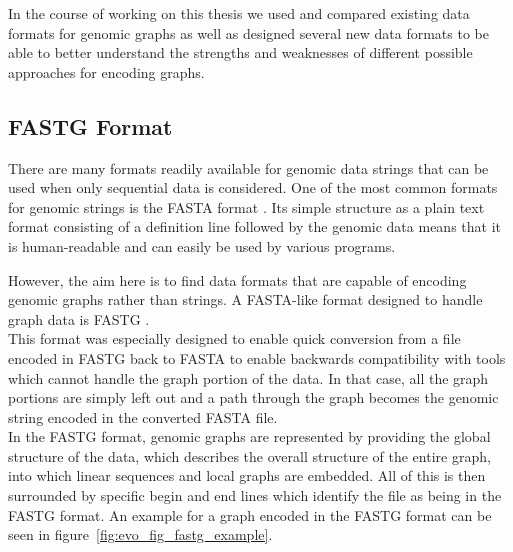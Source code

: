 \documentclass[a4paper,12pt,twoside,BCOR=10mm]{scrbook}
\begin{document}
In the course of working on this thesis we used and compared existing data
formats for genomic graphs as well as designed several new data formats
to be able to better understand the strengths and weaknesses of
different possible approaches for encoding graphs.

\subsection{FASTG Format}

There are many formats readily available for genomic data strings
that can be used when only sequential data is considered.
One of the most common formats for genomic strings is the FASTA format \citep{Childs2007}.
Its simple structure as a plain text format consisting of a definition line
followed by the genomic data means that it is human-readable
and can easily be used by various programs.

However, the aim here is to find data formats that are capable of
encoding genomic graphs rather than strings.
A FASTA-like format designed to handle graph data is FASTG \citep{specFASTG}. \\
This format was especially designed to enable quick conversion from a file
encoded in FASTG back to FASTA to enable backwards compatibility with tools which cannot
handle the graph portion of the data. In that case, all the graph portions are simply left
out and a path through the graph becomes the genomic string encoded in the converted FASTA file. \\
In the FASTG format, genomic graphs are represented by providing the global structure of
the data, which describes the overall structure of the entire graph,
into which linear sequences and local graphs are embedded.
All of this is then surrounded by specific begin and end lines which identify the file as being
in the FASTG format.
An example for a graph encoded in the FASTG format can be seen in figure~\ref{fig:evo_fig_fastg_example}.
\end{document}
